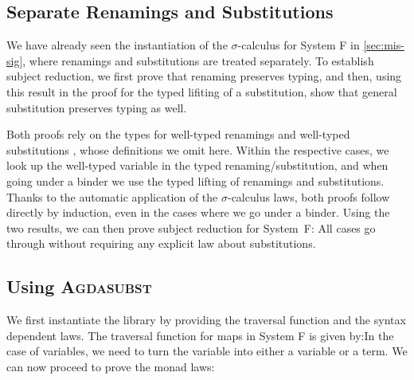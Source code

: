 \documentclass[screen,nonacm]{acmart}
\begin{document}
\subsection*{Separate Renamings and Substitutions}
We have already seen the instantiation of the $\sigma$-calculus for System F in
\cref{sec:mis-sig}, where renamings and substitutions are treated separately.
To establish subject reduction, we first prove that renaming preserves typing,
and then, using this result in the proof for the typed lifiting of a
substitution, show that general substitution preserves typing as well.

\begin{minipage}[t]{0.48\linewidth}
      \raggedright{}
      \ERPT{}
\end{minipage}
\begin{minipage}[t]{0.48\linewidth}
      \raggedright{}
      \ESPT{}
\end{minipage}

Both proofs rely on the types for well-typed renamings \EWTR and well-typed
substitutions \EWTS, whose definitions we omit here. Within the respective
cases, we look up the well-typed variable in the typed renaming/substitution,
and when going under a binder we use the typed lifting of renamings and
substitutions. Thanks to the automatic application of the $\sigma$-calculus
laws, both proofs follow directly by induction, even in the cases where we go
under a binder. Using the two results, we can then prove subject reduction for
System~F: \ESR{}All cases go through without requiring any explicit law about
substitutions.

\subsection*{Using \textsc{Agdasubst}}
We first instantiate the library by providing the traversal function and the syntax dependent laws.
The traversal function for maps in System F is given by:\SFTraversal{}In the case of variables, we need to turn the variable into either a variable or a term. We can now proceed to prove the monad laws:

\begin{minipage}[t]{0.48\linewidth}
      \small
      \raggedright{}
      \SFId{}
\end{minipage}
\begin{minipage}[t]{0.48\linewidth}
      \small
      \raggedright{}
      \SFCompo{}
\end{minipage}
\end{document}
